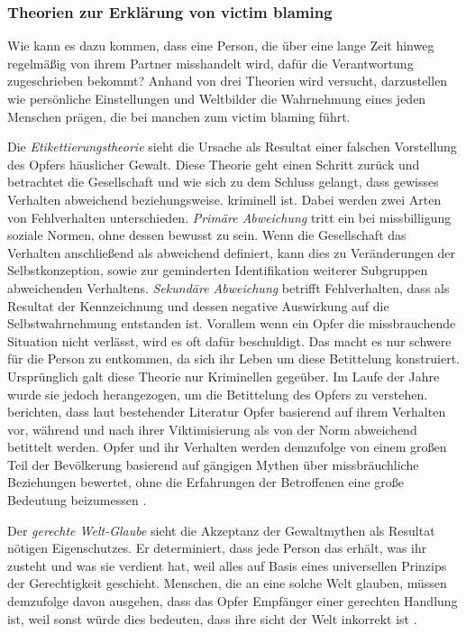 \subsubsection{Theorien zur Erklärung von victim blaming}     \label{2.1.3.3}
Wie kann es dazu kommen, dass eine Person, die über eine lange Zeit hinweg regelmäßig von ihrem Partner misshandelt wird, dafür die Verantwortung zugeschrieben bekommt? Anhand von drei Theorien wird versucht, darzustellen wie persönliche Einstellungen und Weltbilder die Wahrnehmung eines jeden Menschen prägen, die bei manchen zum victim blaming führt.

Die \textit{Etikettierungstheorie} sieht die Ursache als Resultat einer falschen Vorstellung des Opfers häuslicher Gewalt. Diese Theorie geht einen Schritt zurück und betrachtet die Gesellschaft und wie sich zu dem Schluss gelangt, dass gewisses Verhalten abweichend beziehungsweise. kriminell ist. Dabei werden zwei Arten von Fehlverhalten unterschieden. \textit{Primäre Abweichung} tritt ein bei missbilligung soziale Normen, ohne dessen bewusst zu sein. Wenn die Gesellschaft das Verhalten anschließend als abweichend definiert, kann dies zu Veränderungen der Selbstkonzeption, sowie zur geminderten Identifikation weiterer Subgruppen abweichenden Verhaltens. \textit{Sekundäre Abweichung} betrifft Fehlverhalten, dass als Resultat der Kennzeichnung und dessen negative Auswirkung auf die Selbstwahrnehmung entstanden ist. Vorallem wenn ein Opfer die missbrauchende Situation nicht verlässt, wird es oft dafür beschuldigt. Das macht es nur schwere für die Person zu entkommen, da sich ihr Leben um diese Betittelung konstruiert. Ursprünglich galt diese Theorie nur Kriminellen gegeüber. Im Laufe der Jahre wurde sie jedoch herangezogen, um die Betittelung des Opfers zu verstehen. \textcite{Labelingtheory_plus} berichten, dass laut bestehender Literatur Opfer basierend auf ihrem Verhalten vor, während und nach ihrer Viktimisierung als von der Norm abweichend betittelt werden. Opfer und ihr Verhalten werden demzufolge von einem großen Teil der Bevölkerung basierend auf gängigen Mythen über missbräuchliche Beziehungen bewertet, ohne die Erfahrungen der Betroffenen eine große Bedeutung beizumessen \parencite{Labelingtheory_plus}.

Der \textit{gerechte Welt-Glaube} sieht die Akzeptanz der Gewaltmythen als Resultat nötigen Eigenschutzes. Er determiniert, dass jede Person das erhält, was ihr zusteht und was sie verdient hat, weil alles auf Basis eines universellen Prinzips der Gerechtigkeit geschieht. Menschen, die an eine solche Welt glauben, müssen demzufolge davon ausgehen, dass das Opfer Empfänger einer gerechten Handlung ist, weil sonst würde dies bedeuten, dass ihre sicht der Welt inkorrekt ist \parencite{GM_Theorien}. 

